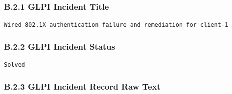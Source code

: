 \documentclass[11pt]{article}
\begin{document}
\subsubsection{B.2.1 GLPI Incident Title}
\label{sec:appendix-b-glpi-incident-title}

\begin{verbatim}
Wired 802.1X authentication failure and remediation for client-1
\end{verbatim}


\subsubsection{B.2.2 GLPI Incident Status}
\label{sec:appendix-b-glpi-incident-status}

\begin{verbatim}
Solved
\end{verbatim}


\subsubsection{B.2.3 GLPI Incident Record Raw Text}
\label{sec:appendix-b-glpi-incident-record-raw-text}
\end{document}
